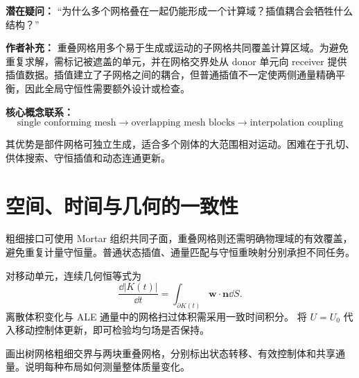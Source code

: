 \begin{authornote}
\textbf{潜在疑问：}
“为什么多个网格叠在一起仍能形成一个计算域？插值耦合会牺牲什么结构？”

\textbf{作者补充：}
重叠网格用多个易于生成或运动的子网格共同覆盖计算区域。为避免重复求解，需标记被遮盖的单元，并在网格交界处从 donor 单元向 receiver 提供插值数据。插值建立了子网格之间的耦合，但普通插值不一定使两侧通量精确平衡，因此全局守恒性需要额外设计或检查。

\textbf{核心概念联系：}
\[
\text{single conforming mesh}
\longrightarrow
\text{overlapping mesh blocks}
\longrightarrow
\text{interpolation coupling}
\]
\end{authornote}

其优势是部件网格可独立生成，适合多个刚体的大范围相对运动。困难在于孔切、供体搜索、守恒插值和动态连通更新。


\section{空间、时间与几何的一致性}
粗细接口可使用 Mortar 组织共同子面，重叠网格则还需明确物理域的有效覆盖，
避免重复计量守恒量。普通状态插值、通量匹配与守恒重映射分别承担不同任务。

对移动单元，连续几何恒等式为
\[
\frac{\dd |K(t)|}{\dd t}
=\int_{\partial K(t)}\bm w\cdot\bm n\dd S.
\]
离散体积变化与 ALE 通量中的网格扫过体积需采用一致时间积分。
将 $U=U_0$ 代入移动控制体更新，即可检验均匀场是否保持。

{画出树网格粗细交界与两块重叠网格，分别标出状态转移、有效控制体和共享通量。说明每种布局如何测量整体质量变化。}
